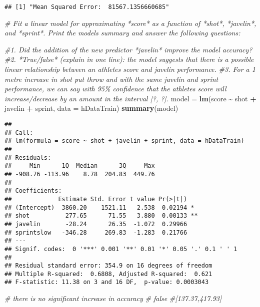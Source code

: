 \documentclass[
]{article}
\newenvironment{Shaded}{\begin{snugshade}}{\end{snugshade}}
\newcommand{\AttributeTok}[1]{\textcolor[rgb]{0.13,0.29,0.53}{#1}}
\newcommand{\CommentTok}[1]{\textcolor[rgb]{0.56,0.35,0.01}{\textit{#1}}}
\newcommand{\FunctionTok}[1]{\textcolor[rgb]{0.13,0.29,0.53}{\textbf{#1}}}
\newcommand{\NormalTok}[1]{#1}
\newcommand{\OtherTok}[1]{\textcolor[rgb]{0.56,0.35,0.01}{#1}}
\newcommand{\SpecialCharTok}[1]{\textcolor[rgb]{0.81,0.36,0.00}{\textbf{#1}}}
\begin{document}
\begin{verbatim}
## [1] "Mean Squared Error:  81567.1356660685"
\end{verbatim}

\begin{Shaded}
\begin{Highlighting}[]
\CommentTok{\# Fit a linear model for approximating *score* as a function of *shot*, *javelin*, and *sprint*. Print the model\textquotesingle{}s summary and answer the following questions:}

\CommentTok{\#1. Did the addition of the new predictor *javelin* improve the model accuracy? }
\CommentTok{\#2. *True/false* (explain in one line): the model suggests that there is a possible linear relationship between an athlete\textquotesingle{}s score and javelin performance.}
\CommentTok{\#3. For a 1 metre increase in shot put throw and with the same javelin and sprint performance, we can say with 95\% confidence that the athlete\textquotesingle{}s score will increase/decrease by an amount in the interval [?, ?].}
\NormalTok{model }\OtherTok{=}  \FunctionTok{lm}\NormalTok{(score }\SpecialCharTok{\textasciitilde{}}\NormalTok{ shot }\SpecialCharTok{+}\NormalTok{ javelin }\SpecialCharTok{+}\NormalTok{ sprint, }\AttributeTok{data =}\NormalTok{ hDataTrain)}
\FunctionTok{summary}\NormalTok{(model)}
\end{Highlighting}
\end{Shaded}

\begin{verbatim}
## 
## Call:
## lm(formula = score ~ shot + javelin + sprint, data = hDataTrain)
## 
## Residuals:
##     Min      1Q  Median      3Q     Max 
## -908.76 -113.96    8.78  204.83  449.76 
## 
## Coefficients:
##             Estimate Std. Error t value Pr(>|t|)   
## (Intercept)  3860.20    1521.11   2.538  0.02194 * 
## shot          277.65      71.55   3.880  0.00133 **
## javelin       -28.24      26.35  -1.072  0.29966   
## sprintslow   -346.28     269.83  -1.283  0.21766   
## ---
## Signif. codes:  0 '***' 0.001 '**' 0.01 '*' 0.05 '.' 0.1 ' ' 1
## 
## Residual standard error: 354.9 on 16 degrees of freedom
## Multiple R-squared:  0.6808, Adjusted R-squared:  0.621 
## F-statistic: 11.38 on 3 and 16 DF,  p-value: 0.0003043
\end{verbatim}

\begin{Shaded}
\begin{Highlighting}[]
\CommentTok{\# there is no significant increase in accuracy}
\CommentTok{\# false}
\CommentTok{\#[137.37,417.93]}
\end{Highlighting}
\end{Shaded}
\end{document}

